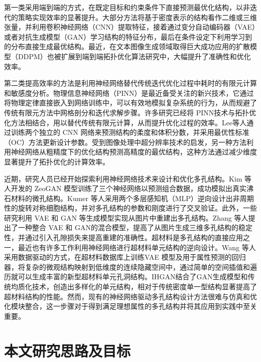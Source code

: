 第一类采用端到端的方式，在既定目标和约束条件下直接预测最优化结构，以非迭代的策略实现效率的显著提升。大部分方法将基于密度表示的结构看作二维或三维张量，并利用卷积神经网络（CNN）提取特征，接着通过变分自动编码器（VAE）或者对抗生成模型（GAN）学习结构的特征分布，最后在条件设定下利用学习到的分布直接生成最优结构。最近，在文本图像生成领域取得巨大成功应用的扩散模型（DDPM）也被扩展到端到端拓扑优化算法研究中，大幅提升了准确性和优化效率。

第二类提高效率的方法是利用神经网络替代传统迭代优化过程中耗时的有限元计算和敏感度分析。物理信息神经网络（PINN）是最近备受关注的新兴技术，它通过将物理定律直接嵌入到网络训练中，可以有效地模拟复杂系统的行为，从而规避了传统有限元方法中网格剖分和迭代求解步骤。许多研究已经将 PINN技术与拓扑优化方法相结合，用以替代传统有限元计算，从而提升优化过程的效率。Lee等人通过训练两个独立的 CNN 网络来预测结构的柔度和体积分数，并采用最优性标准（OC）方法更新设计参数。受到图像处理中超分辨率技术的启发，另一种方法利用神经网络从粗精度下的优化结构预测高精度的最优结构，这种方法通过减少维度显著提升了拓扑优化的计算效率。

近期，研究人员已经开始探索利用神经网络技术来设计和优化多孔结构。Kim 等人开发的 ZeoGAN 模型训练了三个神经网络以预测组合数据，成功模拟出真实沸石材料的微孔结构。Kumer 等人采用两个多层感知机（MLP）逆向设计出非周期性的旋转对称细胞结构，并对多孔结构的参数和刚度进行了交叉验证。此外，一些研究利用 VAE 和 GAN 等生成模型实现从图片中重建出多孔结构。Zhang 等人提出了一种整合 VAE 和 GAN的混合模型，提高了从图片生成三维多孔结构的稳定性，并通过引入孔隙损失来提高重建的准确性。超材料是多孔结构的直接应用之一，最近也有许多工作利用神经网络进行超材料单元结构的逆向设计。Wang 等人采用数据驱动的方式，在超材料数据库上训练VAE 模型及用于属性预测的回归器，将复杂的微观结构映射到低维度的连续隐藏空间中，通过简单的空间插值和遍历就可以生成丰富的新型超材料单元孔洞结构。IHGAN结合了GAN生成模型和传统均质化技术，创造出多样化的单元结构，相对于传统密度单一型结构显著提高了超材料结构的性能。然而，现有的神经网络驱动多孔结构设计方法很难与仿真和优化模块整合，这一步骤对于得到满足理想属性的多孔结构并将其应用到实践中至关重要。

\section{本文研究思路及目标}